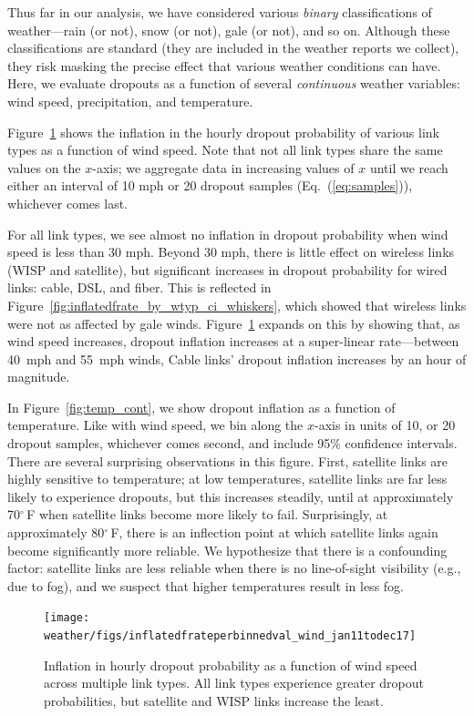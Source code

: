 Thus far in our analysis, we have considered various \emph{binary}
classifications of weather---rain (or not), snow (or not), gale (or
not), and so on.
%
Although these classifications are standard (they are included in the
weather reports we collect), they risk masking the precise effect that
various weather conditions can have.
%
Here, we evaluate dropouts as a function of several \emph{continuous}
weather variables: wind speed, precipitation, and temperature.


Figure~\ref{fig:wind_cont} shows the inflation in the hourly dropout
probability of various link types as a function of wind speed.
%
Note that not all link types share the same values on the $x$-axis;
we aggregate data in increasing values of $x$ until we reach either an
interval of 10 mph or 20 dropout samples (Eq.~(\ref{eq:samples})), whichever comes last.


For all link types, we see almost no inflation in dropout probability
when wind speed is less than 30 mph.
%
Beyond 30 mph, there is little effect on wireless links (WISP and
satellite), but significant increases in dropout probability for wired
links: cable, DSL, and fiber.
%
This is reflected in
Figure~\ref{fig:inflatedfrate_by_wtyp_ci_whiskers}, which showed that
wireless links were not as affected by gale winds.
%
Figure~\ref{fig:wind_cont} expands on this by showing that, as wind speed
increases, dropout inflation increases at a super-linear rate---between
40~mph and 55~mph winds, Cable links' dropout inflation increases by an
hour of magnitude.


In Figure~\ref{fig:temp_cont}, we show dropout inflation as a function
of temperature.
%
Like with wind speed, we bin along the $x$-axis in units of 10, or
20 dropout samples, whichever comes second, and include 95\% confidence
intervals.
%
There are several surprising observations in this figure.
%
First, satellite links are highly sensitive to temperature; at low
temperatures, satellite links are far less likely to experience
dropouts, but this increases steadily, until at approximately
70$^\circ$\,F when satellite links become more likely to fail.
%
Surprisingly, at approximately 80$^\circ$\,F, there is an inflection point at
which satellite links again become significantly more reliable.
%
We hypothesize that there is a confounding factor: satellite links are
less reliable when there is no line-of-sight visibility (e.g., due to
fog), and we suspect that higher temperatures result in less fog.


\begin{figure}[t]
\centering
\texttt{[image: weather/figs/inflatedfrateperbinnedval\_wind\_jan11todec17]}
\caption{
\label{fig:wind_cont}
\figdone
Inflation in hourly dropout probability as a function of wind speed
	across multiple link types. All link types experience greater
	dropout probabilities, but satellite and WISP links increase the
	least.  }
\end{figure}

